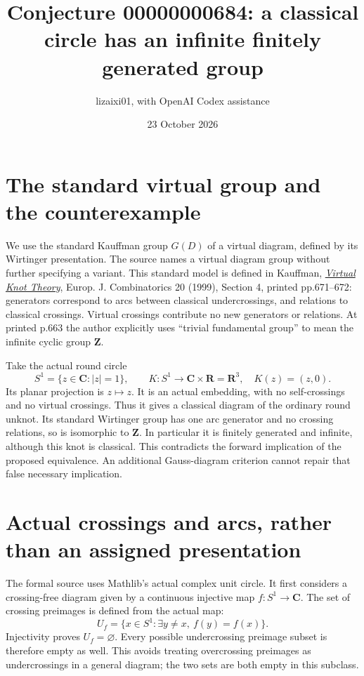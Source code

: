 \documentclass[11pt]{article}
\title{Conjecture 00000000684: a classical circle has an infinite finitely generated group}
\author{lizaixi01, with OpenAI Codex assistance}
\date{23 October 2026}
\begin{document}
\maketitle
\section{The standard virtual group and the counterexample}
We use the standard Kauffman group $G(D)$ of a virtual diagram,
defined by its Wirtinger presentation. The source names a virtual
diagram group without further specifying a variant. This standard
model is defined in Kauffman,
\href{https://homepages.math.uic.edu/~kauffman/VKT.pdf}
{\emph{Virtual Knot Theory}}, Europ. J. Combinatorics 20 (1999),
Section 4, printed pp.671--672: generators correspond to arcs between
classical undercrossings, and relations to classical crossings.
Virtual crossings contribute no new generators or relations.
At printed p.663 the author explicitly uses ``trivial fundamental
group'' to mean the infinite cyclic group $\mathbf Z$.

Take the actual round circle
\[
 S^1=\{z\in\mathbf C:|z|=1\},\qquad
 K:S^1\longrightarrow\mathbf C\times\mathbf R=\mathbf R^3,
 \quad K(z)=(z,0).
\]
Its planar projection is $z\mapsto z$. It is an actual embedding,
with no self-crossings and no virtual crossings. Thus it gives a
classical diagram of the ordinary round unknot. Its standard
Wirtinger group has one arc generator and no crossing relations,
so is isomorphic to $\mathbf Z$. In particular it is finitely
generated and infinite, although this knot is classical. This
contradicts the forward implication of the proposed equivalence.
An additional Gauss-diagram criterion cannot repair that false
necessary implication.

\section{Actual crossings and arcs, rather than an assigned presentation}
The formal source uses Mathlib's actual complex unit circle.
It first considers a crossing-free diagram given by a continuous
injective map $f:S^1\to\mathbf C$. The set of crossing preimages is
defined from the actual map:
\[
 U_f=\{x\in S^1:\exists y\ne x,\ f(y)=f(x)\}.
\]
Injectivity proves $U_f=\varnothing$. Every possible undercrossing
preimage subset is therefore empty as well. This avoids treating
overcrossing preimages as undercrossings in a general diagram;
the two sets are both empty in this subclass.
\end{document}
